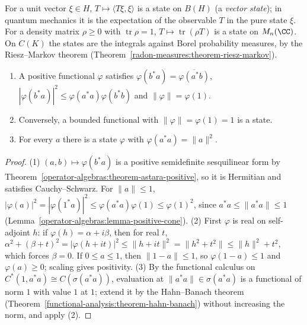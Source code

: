 \begin{example}\label{operator-algebras:example-states}
For a unit vector $\xi \in H$, $T \mapsto \langle T\xi, \xi\rangle$ is a state on $B(H)$ (a \emph{vector state}); in quantum mechanics it is the expectation of the observable $T$ in the pure state $\xi$. For a density matrix
$\rho \geq 0$ with $\operatorname{tr}\rho = 1$, $T \mapsto \operatorname{tr}(\rho T)$ is a state on $M_n(\CC)$. On $C(K)$ the states are the integrals against Borel probability measures, by the Riesz--Markov theorem
(Theorem~\ref{radon-measures:theorem-riesz-markov}).
\end{example}

\begin{lemma}\label{operator-algebras:lemma-states}
\begin{enumerate}
\item A positive functional $\varphi$ satisfies $\varphi(b^*a) = \overline{\varphi(a^*b)}$, $|\varphi(b^*a)|^2 \leq \varphi(a^*a)\varphi(b^*b)$ and $\|\varphi\| = \varphi(1)$.
\item Conversely, a bounded functional with $\|\varphi\| = \varphi(1) = 1$ is a state.
\item For every $a$ there is a state $\varphi$ with $\varphi(a^*a) = \|a\|^2$.
\end{enumerate}
\end{lemma}

\begin{proof}
(1) $(a, b) \mapsto \varphi(b^*a)$ is a positive semidefinite sesquilinear form by Theorem~\ref{operator-algebras:theorem-astara-positive}, so it is Hermitian and satisfies Cauchy--Schwarz. For $\|a\| \leq 1$,
$|\varphi(a)|^2 = |\varphi(1^*a)|^2 \leq \varphi(a^*a)\varphi(1) \leq \varphi(1)^2$, since $a^*a \leq \|a^*a\| \leq 1$ (Lemma~\ref{operator-algebras:lemma-positive-cone}). (2) First $\varphi$ is real on self-adjoint $h$: if
$\varphi(h) = \alpha + i\beta$, then for real $t$, $\alpha^2 + (\beta + t)^2 = |\varphi(h + it)|^2 \leq \|h + it\|^2 = \|h^2 + t^2\| \leq \|h\|^2 + t^2$, which forces $\beta = 0$. If $0 \leq a \leq 1$, then $\|1 - a\| \leq 1$, so
$\varphi(1 - a) \leq 1$ and $\varphi(a) \geq 0$; scaling gives positivity. (3) By the functional calculus on $C^*(1, a^*a) \cong C(\sigma(a^*a))$, evaluation at $\|a^*a\| \in \sigma(a^*a)$ is a functional of norm $1$ with value $1$ at $1$;
extend it by the Hahn--Banach theorem (Theorem~\ref{functional-analysis:theorem-hahn-banach}) without increasing the norm, and apply (2).
\end{proof}

